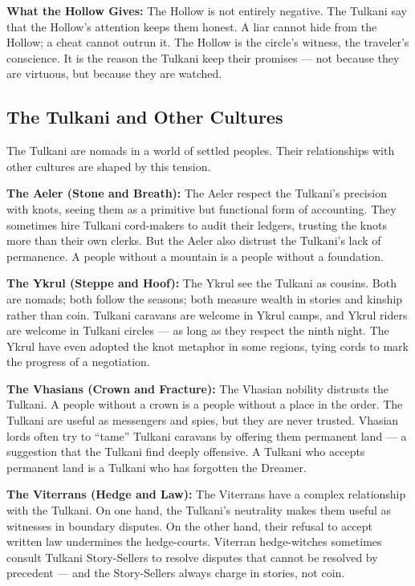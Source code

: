 \textbf{What the Hollow Gives:} The Hollow is not entirely negative. The Tulkani say that the Hollow's attention keeps them honest. A liar cannot hide from the Hollow; a cheat cannot outrun it. The Hollow is the circle's witness, the traveler's conscience. It is the reason the Tulkani keep their promises --- not because they are virtuous, but because they are watched.

\subsection*{The Tulkani and Other Cultures}
\label{subsec:tulkani-relations}

The Tulkani are nomads in a world of settled peoples. Their relationships with other cultures are shaped by this tension.

\textbf{The Aeler (Stone and Breath):} The Aeler respect the Tulkani's precision with knots, seeing them as a primitive but functional form of accounting. They sometimes hire Tulkani cord-makers to audit their ledgers, trusting the knots more than their own clerks. But the Aeler also distrust the Tulkani's lack of permanence. A people without a mountain is a people without a foundation.

\textbf{The Ykrul (Steppe and Hoof):} The Ykrul see the Tulkani as cousins. Both are nomads; both follow the seasons; both measure wealth in stories and kinship rather than coin. Tulkani caravans are welcome in Ykrul camps, and Ykrul riders are welcome in Tulkani circles --- as long as they respect the ninth night. The Ykrul have even adopted the knot metaphor in some regions, tying cords to mark the progress of a negotiation.

\textbf{The Vhasians (Crown and Fracture):} The Vhasian nobility distrusts the Tulkani. A people without a crown is a people without a place in the order. The Tulkani are useful as messengers and spies, but they are never trusted. Vhasian lords often try to ``tame'' Tulkani caravans by offering them permanent land --- a suggestion that the Tulkani find deeply offensive. A Tulkani who accepts permanent land is a Tulkani who has forgotten the Dreamer.

\textbf{The Viterrans (Hedge and Law):} The Viterrans have a complex relationship with the Tulkani. On one hand, the Tulkani's neutrality makes them useful as witnesses in boundary disputes. On the other hand, their refusal to accept written law undermines the hedge-courts. Viterran hedge-witches sometimes consult Tulkani Story-Sellers to resolve disputes that cannot be resolved by precedent --- and the Story-Sellers always charge in stories, not coin.

